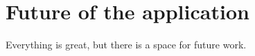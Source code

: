 \chapter{Future of the application}\label{ch:concl}
Everything is great, but there is a space for future work.